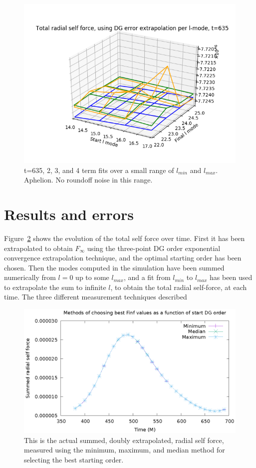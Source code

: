 \begin{figure}
  \includegraphics{bestfinflminlmax234termst635smallrange_perihelion}
  \caption{t=635, 2, 3, and 4 term fits over a small range of $l_{min}$ and $l_{max}$. Aphelion. No roundoff noise in this range.}
  \label{surface234small}
\end{figure}



\section{Results and errors}

Figure~\ref{totalselfforcevt} shows the evolution of the total self force over time. First it has been extrapolated to obtain $F_\infty$ using the three-point DG order exponential convergence extrapolation technique, and the optimal starting order has been chosen. Then the modes computed in the simulation have been summed numerically from $l=0$ up to some $l_{max}$, and a fit from $l_{min}$ to $l_{max}$ has been used to extrapolate the sum to infinite $l$, to obtain the total radial self-force, at each time. The three different measurement techniques described 


\begin{figure}
  \includegraphics{bestfinfscriptplot.eps}
  \caption{This is the actual summed, doubly extrapolated, radial self force, measured using the minimum, maximum, and median method for selecting the best starting order.}
\label{totalselfforcevt}
\end{figure}


